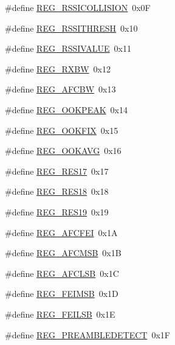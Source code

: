 \begin{DoxyCompactItemize}
\item 
\#define \hyperlink{sx1276Regs-Fsk_8h_ad810a0e5aaa761e8edbe804df2e4f5fe}{R\+E\+G\+\_\+\+R\+S\+S\+I\+C\+O\+L\+L\+I\+S\+I\+ON}~0x0F
\item 
\#define \hyperlink{sx1276Regs-Fsk_8h_ab3af0df6e457f5b5f994d1c19dc2642f}{R\+E\+G\+\_\+\+R\+S\+S\+I\+T\+H\+R\+E\+SH}~0x10
\item 
\#define \hyperlink{sx1276Regs-Fsk_8h_a7ff36314652a235acc13fa6ab5504e3d}{R\+E\+G\+\_\+\+R\+S\+S\+I\+V\+A\+L\+UE}~0x11
\item 
\#define \hyperlink{sx1276Regs-Fsk_8h_a1bbbafd83ab10909a8dd5385fd0dfff8}{R\+E\+G\+\_\+\+R\+X\+BW}~0x12
\item 
\#define \hyperlink{sx1276Regs-Fsk_8h_aa4a7b5b5d63e9f8ef8f8dc4d7984753c}{R\+E\+G\+\_\+\+A\+F\+C\+BW}~0x13
\item 
\#define \hyperlink{sx1276Regs-Fsk_8h_a4a6adb6f15f5e4fe71a627d96f6f8141}{R\+E\+G\+\_\+\+O\+O\+K\+P\+E\+AK}~0x14
\item 
\#define \hyperlink{sx1276Regs-Fsk_8h_a585aebf4bf7b6d781ac836ade0f00aad}{R\+E\+G\+\_\+\+O\+O\+K\+F\+IX}~0x15
\item 
\#define \hyperlink{sx1276Regs-Fsk_8h_ad0c870505b9062bb61176ba9076e9b5e}{R\+E\+G\+\_\+\+O\+O\+K\+A\+VG}~0x16
\item 
\#define \hyperlink{sx1276Regs-Fsk_8h_a6a38821b7a89a409d200dbd0420c92c8}{R\+E\+G\+\_\+\+R\+E\+S17}~0x17
\item 
\#define \hyperlink{sx1276Regs-Fsk_8h_a855a1d320f1a948b9210dbd3a7ecc4cc}{R\+E\+G\+\_\+\+R\+E\+S18}~0x18
\item 
\#define \hyperlink{sx1276Regs-Fsk_8h_a1459e2972b36abc24aeed3b664cbe2c1}{R\+E\+G\+\_\+\+R\+E\+S19}~0x19
\item 
\#define \hyperlink{sx1276Regs-Fsk_8h_a04f60f1d03035cf80cebff9648a894c0}{R\+E\+G\+\_\+\+A\+F\+C\+F\+EI}~0x1A
\item 
\#define \hyperlink{sx1276Regs-Fsk_8h_a989d0164e5d5090b39e25506526e0aa5}{R\+E\+G\+\_\+\+A\+F\+C\+M\+SB}~0x1B
\item 
\#define \hyperlink{sx1276Regs-Fsk_8h_a4c64591ff1cb9d48f90c679a6f5985c7}{R\+E\+G\+\_\+\+A\+F\+C\+L\+SB}~0x1C
\item 
\#define \hyperlink{sx1276Regs-Fsk_8h_a99f252ad098770ae36c2947075ba011a}{R\+E\+G\+\_\+\+F\+E\+I\+M\+SB}~0x1D
\item 
\#define \hyperlink{sx1276Regs-Fsk_8h_a02e249f7bd9ca6c91dea006e205bbbe5}{R\+E\+G\+\_\+\+F\+E\+I\+L\+SB}~0x1E
\item 
\#define \hyperlink{sx1276Regs-Fsk_8h_a8acf717d67c4e7f4b92a25653ddb495c}{R\+E\+G\+\_\+\+P\+R\+E\+A\+M\+B\+L\+E\+D\+E\+T\+E\+CT}~0x1F

\end{DoxyCompactItemize}
